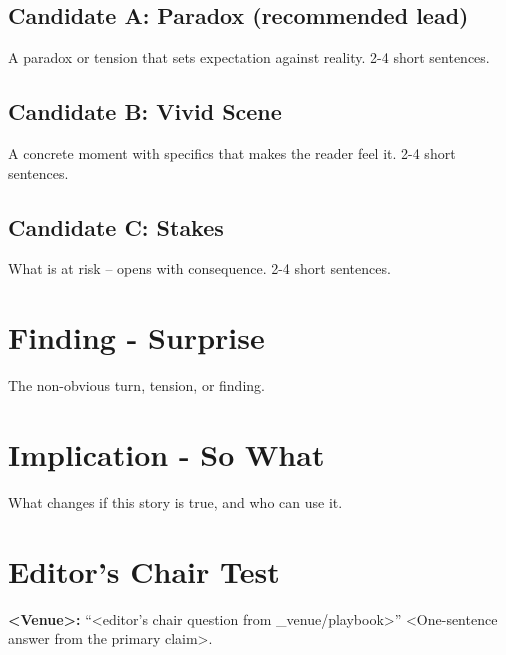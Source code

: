 \documentclass[11pt]{article}
\begin{document}
\subsection*{Candidate A: Paradox (recommended lead)}
A paradox or tension that sets expectation against reality. 2-4 short sentences.

\subsection*{Candidate B: Vivid Scene}
A concrete moment with specifics that makes the reader feel it. 2-4 short sentences.

\subsection*{Candidate C: Stakes}
What is at risk -- opens with consequence. 2-4 short sentences.


\section*{Finding - Surprise}
The non-obvious turn, tension, or finding.

\section*{Implication - So What}
What changes if this story is true, and who can use it.

\section*{Editor's Chair Test}
\textbf{<Venue>:} ``<editor's chair question from \_venue/playbook>''
%
<One-sentence answer from the primary claim>.
\end{document}
